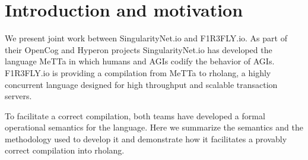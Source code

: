 \section{Introduction and motivation}
We present joint work between SingularityNet.io and F1R3FLY.io. As part of their OpenCog and Hyperon projects SingularityNet.io has developed the language MeTTa in which humans and AGIs codify the behavior of AGIs. F1R3FLY.io is providing a compilation from MeTTa to rholang, a highly concurrent language designed for high throughput and scalable transaction servers.

To facilitate a correct compilation, both teams have developed a formal operational semantics for the language. Here we summarize the semantics and the methodology used to develop it and demonstrate how it facilitates a provably correct compilation into rholang.
